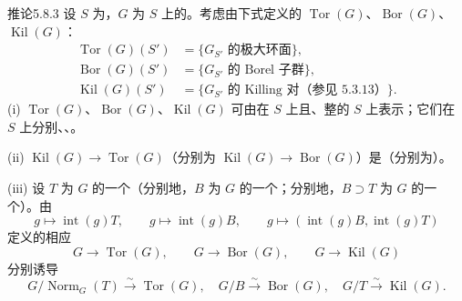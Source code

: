 \begin{SGAresult}{推论}{5.8.3}
设 $S$ 为，$G$ 为 $S$ 上的。考虑由下式定义的 $\operatorname{Tor}(G)$、$\operatorname{Bor}(G)$、$\operatorname{Kil}(G)$：
\[\begin{aligned}
\operatorname{Tor}(G)(S')&=\{G_{S'}\text{ 的极大环面}\},\\
\operatorname{Bor}(G)(S')&=\{G_{S'}\text{ 的 Borel 子群}\},\\
\operatorname{Kil}(G)(S')&=\{G_{S'}\text{ 的 Killing 对（参见 5.3.13）}\}.
\end{aligned}\]
(i) $\operatorname{Tor}(G)$、$\operatorname{Bor}(G)$、$\operatorname{Kil}(G)$ 可由在 $S$ 上且、整的 $S$ 上表示；它们在 $S$ 上分别、、。

(ii)  $\operatorname{Kil}(G)\to\operatorname{Tor}(G)$（分别为 $\operatorname{Kil}(G)\to\operatorname{Bor}(G)$）是（分别为）。

(iii) 设 $T$ 为 $G$ 的一个（分别地，$B$ 为 $G$ 的一个；分别地，$B\supset T$ 为 $G$ 的一个）。由
\[g\mapsto\operatorname{int}(g)T,\qquad
 g\mapsto\operatorname{int}(g)B,\qquad
 g\mapsto(\operatorname{int}(g)B,\operatorname{int}(g)T)\]
定义的相应
\[G\to\operatorname{Tor}(G),\qquad G\to\operatorname{Bor}(G),\qquad G\to\operatorname{Kil}(G)\]
分别诱导
\[G/\operatorname{Norm}_G(T)\xrightarrow\sim\operatorname{Tor}(G),\quad
G/B\xrightarrow\sim\operatorname{Bor}(G),\quad
G/T\xrightarrow\sim\operatorname{Kil}(G).\]
\end{SGAresult}
